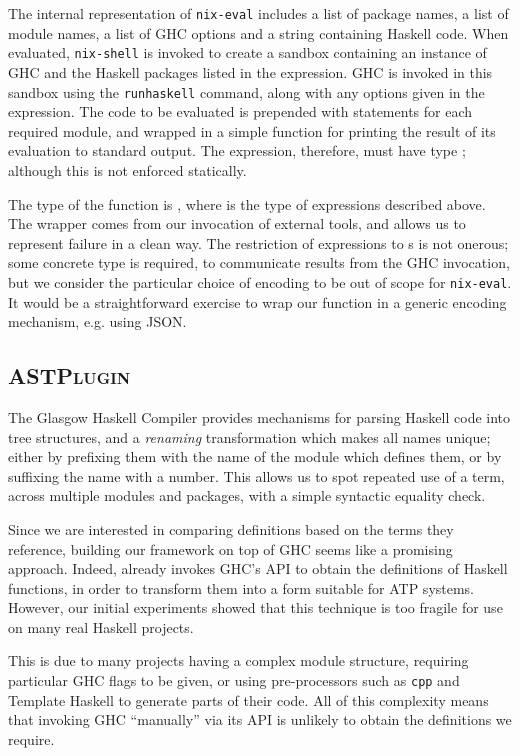 The internal representation of \texttt{nix-eval} includes a list of package names, a list of module names, a list of GHC options and a string containing Haskell code. When evaluated, \texttt{nix-shell} is invoked to create a sandbox containing an instance of GHC and the Haskell packages listed in the expression. GHC is invoked in this sandbox using the \texttt{runhaskell} command, along with any options given in the expression. The code to be evaluated is prepended with  statements for each required module, and wrapped in a simple  function for printing the result of its evaluation to standard output. The expression, therefore, must have type ; although this is not enforced statically.

The type of the  function is , where  is the type of expressions described above. The  wrapper comes from our invocation of external tools, and  allows us to represent failure in a clean way. The restriction of expressions to s is not onerous; some concrete type is required, to communicate results from the GHC invocation, but we consider the particular choice of encoding to be out of scope for \texttt{nix-eval}. It would be a straightforward exercise to wrap our  function in a generic encoding mechanism, e.g. using JSON.

\subsection{\textsc{ASTPlugin}}\label{astplugin}

The Glasgow Haskell Compiler provides mechanisms for parsing Haskell code into tree structures, and a \emph{renaming} transformation which makes all names unique; either by prefixing them with the name of the module which defines them, or by suffixing the name with a number. This allows us to spot repeated use of a term, across multiple modules and packages, with a simple syntactic equality check.

Since we are interested in comparing definitions based on the terms they reference, building our framework on top of GHC seems like a promising approach. Indeed, \hspec{} already invokes GHC's API to obtain the definitions of Haskell functions, in order to transform them into a form suitable for ATP systems. However, our initial experiments showed that this technique is too fragile for use on many real Haskell projects.

This is due to many projects having a complex module structure, requiring particular GHC flags to be given, or using pre-processors such as \texttt{cpp} and Template Haskell to generate parts of their code. All of this complexity means that invoking GHC ``manually'' via its API is unlikely to obtain the definitions we require.

